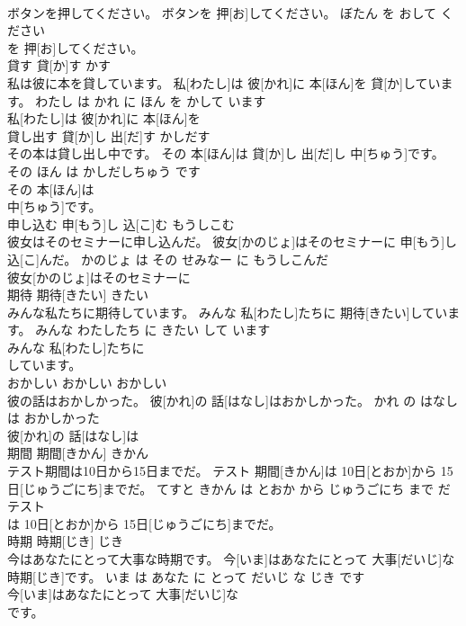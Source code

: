 \documentclass[8pt]{extreport}
\begin{document}
\begin{CJK}{UTF8}{min}
\\	ボタンを押してください。	ボタンを 押[お]してください。	ぼたん を おして ください	
\\	を 押[お]してください。			
\\	貸す	貸[か]す	かす	
\\	私は彼に本を貸しています。	私[わたし]は 彼[かれ]に 本[ほん]を 貸[か]しています。	わたし は かれ に ほん を かして います	
\\	私[わたし]は 彼[かれ]に 本[ほん]を
\\	貸し出す	貸[か]し 出[だ]す	かしだす	
\\	その本は貸し出し中です。	その 本[ほん]は 貸[か]し 出[だ]し 中[ちゅう]です。	その ほん は かしだしちゅう です	
\\	その 本[ほん]は
\\	中[ちゅう]です。			
\\	申し込む	申[もう]し 込[こ]む	もうしこむ	
\\	彼女はそのセミナーに申し込んだ。	彼女[かのじょ]はそのセミナーに 申[もう]し 込[こ]んだ。	かのじょ は その せみなー に もうしこんだ	
\\	彼女[かのじょ]はそのセミナーに
\\	期待	期待[きたい]	きたい	
\\	みんな私たちに期待しています。	みんな 私[わたし]たちに 期待[きたい]しています。	みんな わたしたち に きたい して います	
\\	みんな 私[わたし]たちに
\\	しています。			
\\	おかしい	おかしい	おかしい	
\\	彼の話はおかしかった。	彼[かれ]の 話[はなし]はおかしかった。	かれ の はなし は おかしかった	
\\	彼[かれ]の 話[はなし]は
\\	期間	期間[きかん]	きかん	
\\	テスト期間は10日から15日までだ。	テスト 期間[きかん]は 10日[とおか]から 15日[じゅうごにち]までだ。	てすと きかん は とおか から じゅうごにち まで だ	
\\	テスト
\\	は 10日[とおか]から 15日[じゅうごにち]までだ。			
\\	時期	時期[じき]	じき	
\\	今はあなたにとって大事な時期です。	今[いま]はあなたにとって 大事[だいじ]な 時期[じき]です。	いま は あなた に とって だいじ な じき です	
\\	今[いま]はあなたにとって 大事[だいじ]な
\\	です。			

\end{CJK}
\end{document}
